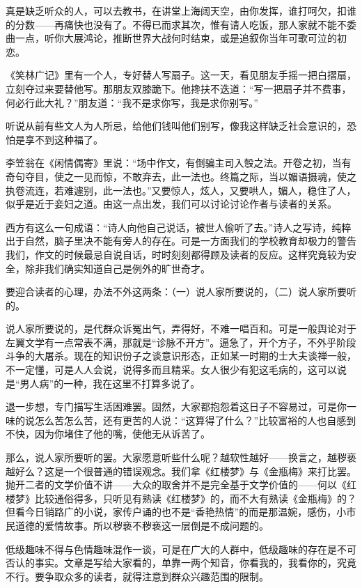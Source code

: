 \par 真是缺乏听众的人，可以去教书，在讲堂上海阔天空，由你发挥，谁打呵欠，扣谁的分数——再痛快也没有了。不得已而求其次，惟有请人吃饭，那人家就不能不委曲一点，听你大展鸿论，推断世界大战何时结束，或是追叙你当年可歌可泣的初恋。
\par 《笑林广记》里有一个人，专好替人写扇子。这一天，看见朋友手摇一把白摺扇，立刻夺过来要替他写。那朋友双膝跪下。他搀扶不迭道：“写一把扇子并不费事，何必行此大礼？”朋友道：“我不是求你写，我是求你别写。”
\par 听说从前有些文人为人所忌，给他们钱叫他们别写，像我这样缺乏社会意识的，恐怕是享不到这种福了。
\par 李笠翁在《闲情偶寄》里说：“场中作文，有倒骗主司入彀之法。开卷之初，当有奇句夺目，使之一见而惊，不敢弃去，此一法也。终篇之际，当以媚语摄魂，使之执卷流连，若难遽别，此一法也。”又要惊人，炫人，又要哄人，媚人，稳住了人，似乎是近于妾妇之道。由这一点出发，我们可以讨论讨论作者与读者的关系。
\par 西方有这么一句成语：“诗人向他自己说话，被世人偷听了去。”诗人之写诗，纯粹出于自然，脑子里决不能有旁人的存在。可是一方面我们的学校教育却极力的警告我们，作文的时候最忌自说自话，时时刻刻都得顾及读者的反应。这样究竟较为安全，除非我们确实知道自己是例外的旷世奇才。
\par 要迎合读者的心理，办法不外这两条：（一）说人家所要说的，（二）说人家所要听的。
\par 说人家所要说的，是代群众诉冤出气，弄得好，不难一唱百和。可是一般舆论对于左翼文学有一点常表不满，那就是“诊脉不开方”。逼急了，开个方子，不外乎阶段斗争的大屠杀。现在的知识份子之谈意识形态，正如某一时期的士大夫谈禅一般，不一定懂，可是人人会说，说得多而且精采。女人很少有犯这毛病的，这可以说是“男人病”的一种，我在这里不打算多说了。
\par 退一步想，专门描写生活困难罢。固然，大家都抱怨着这日子不容易过，可是你一味的说怎么苦怎么苦，还有更苦的人说：“这算得了什么？”比较富裕的人也自感到不快，因为你堵住了他的嘴，使他无从诉苦了。
\par 那么，说人家所要听的罢。大家愿意听些什么呢？越软性越好——换言之，越秽亵越好么？这是一个很普通的错误观念。我们拿《红楼梦》与《金瓶梅》来打比罢。抛开二者的文学价值不讲——大众的取舍并不是完全基于文学价值的——何以《红楼梦》比较通俗得多，只听见有熟读《红楼梦》的，而不大有熟读《金瓶梅》的？但看今日销路广的小说，家传户诵的也不是“香艳热情”的而是那温婉，感伤，小市民道德的爱情故事。所以秽亵不秽亵这一层倒是不成问题的。
\par 低级趣味不得与色情趣味混作一谈，可是在广大的人群中，低级趣味的存在是不可否认的事实。文章是写给大家看的，单靠一两个知音，你看我的，我看你的，究竟不行。要争取众多的读者，就得注意到群众兴趣范围的限制。
